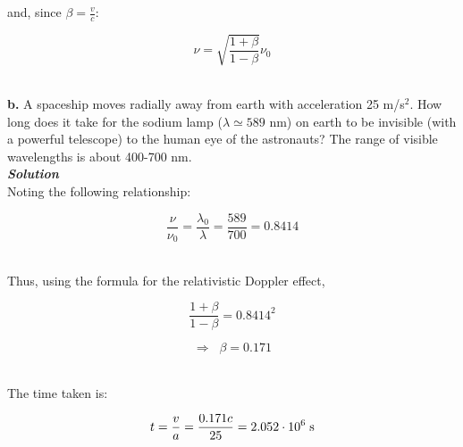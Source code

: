 \documentclass[9pt]{extarticle}
\newcommand{\bfit}[1]{\textbf{\textit{#1}}}
\begin{document}
\begin{multicols*}{2}
and, since $\beta = \frac vc$:

$$\nu =\sqrt{\frac{1+\beta}{1-\beta}} \nu_0$$ \ 






\dotfill 

\hfill 

{\Large \bf b.} A spaceship moves radially away from earth with acceleration 25 m/s$^2$. How long does it take for the sodium lamp ($\lambda \simeq 589$ nm) on earth to be invisible (with a powerful telescope) to the human eye of the astronauts? The range of visible wavelengths is about 400-700 nm. \\ 

{\bfit{Solution}} \\ 

Noting the following relationship:

$$\frac{\nu}{\nu_0} = \frac{\lambda_0}{\lambda} = \frac{589}{700} = 0.8414$$ \ 

Thus, using the formula for the relativistic Doppler effect, 

$$\frac{1+\beta}{1-\beta} = 0.8414^2$$

$$\Longrightarrow \; \; \beta = 0.171$$ \

The time taken is: 

$$t = \frac va = \frac{0.171c}{25} = 2.052\cdot 10^6 \; \text s$$ \  

\end{multicols*}
\end{document}
